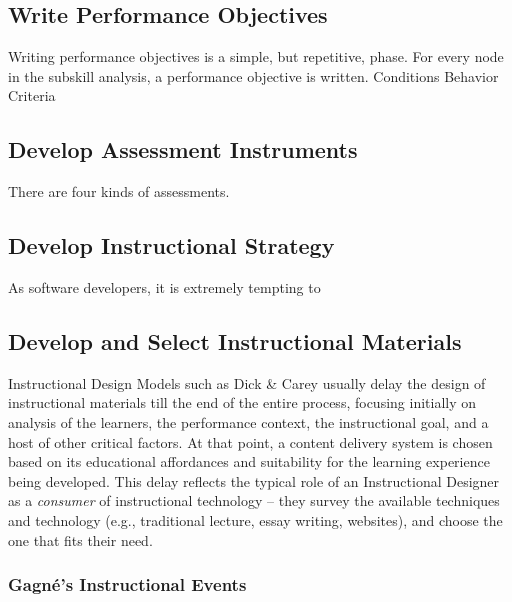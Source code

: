 \documentclass{sig-alternate}
\begin{document}
\subsection{Write Performance Objectives}

Writing performance objectives is a simple, but repetitive, phase.
For every node in the subskill analysis, a performance objective is written.
Conditions
Behavior
Criteria

\subsection{Develop Assessment Instruments}

There are four kinds of assessments.

\subsection{Develop Instructional Strategy}
As software developers, it is extremely tempting to 

\subsection{Develop and Select Instructional Materials}
Instructional Design Models such as Dick \& Carey usually delay the design of instructional materials till the end of the entire process, focusing initially on analysis of the learners, the performance context, the instructional goal, and a host of other critical factors. At that point, a content delivery system is chosen based on its educational affordances and suitability for the learning experience being developed. This delay reflects the typical role of an Instructional Designer as a \textit{consumer} of instructional technology -- they survey the available techniques and technology (e.g., traditional lecture, essay writing, websites), and choose the one that fits their need.

\subsubsection{Gagn\'{e}'s Instructional Events}
\end{document}
